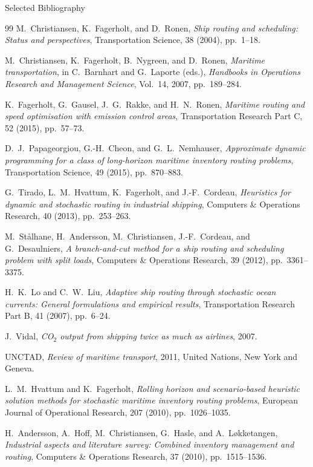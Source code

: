 \documentclass[aspectratio=169,10pt]{beamer}
\begin{document}
\begin{frame}[allowframebreaks]{Selected Bibliography}
  \begin{thebibliography}{99}
    M.\ Christiansen, K.\ Fagerholt, and D.\ Ronen,
    \emph{Ship routing and scheduling: Status and perspectives},
    Transportation Science, 38 (2004), pp.\ 1--18.

    M.\ Christiansen, K.\ Fagerholt, B.\ Nygreen, and D.\ Ronen,
    \emph{Maritime transportation},
    in C.\ Barnhart and G.\ Laporte (eds.),
    \textit{Handbooks in Operations Research and Management Science},
    Vol.\ 14, 2007, pp.\ 189--284.

    K.\ Fagerholt, G.\ Gausel, J.\ G.\ Rakke, and H.\ N.\ Ronen,
    \emph{Maritime routing and speed optimisation with emission control areas},
    Transportation Research Part C, 52 (2015), pp.\ 57--73.

    D.\ J.\ Papageorgiou, G.-H.\ Cheon, and G.\ L.\ Nemhauser,
    \emph{Approximate dynamic programming for a class of long-horizon
    maritime inventory routing problems},
    Transportation Science, 49 (2015), pp.\ 870--883.

    G.\ Tirado, L.\ M.\ Hvattum, K.\ Fagerholt, and J.-F.\ Cordeau,
    \emph{Heuristics for dynamic and stochastic routing in industrial shipping},
    Computers \& Operations Research, 40 (2013), pp.\ 253--263.

    M.\ St\aa lhane, H.\ Andersson, M.\ Christiansen, J.-F.\ Cordeau, and
    G.\ Desaulniers,
    \emph{A branch-and-cut method for a ship routing and scheduling problem
    with split loads},
    Computers \& Operations Research, 39 (2012), pp.\ 3361--3375.

    H.\ K.\ Lo and C.\ W.\ Liu,
    \emph{Adaptive ship routing through stochastic ocean currents:
    General formulations and empirical results},
    Transportation Research Part B, 41 (2007), pp.\ 6--24.

    J.\ Vidal,
    \emph{CO$_2$ output from shipping twice as much as airlines}, 2007.

    UNCTAD,
    \emph{Review of maritime transport}, 2011,
    United Nations, New York and Geneva.

    L.\ M.\ Hvattum and K.\ Fagerholt,
    \emph{Rolling horizon and scenario-based heuristic solution methods
    for stochastic maritime inventory routing problems},
    European Journal of Operational Research, 207 (2010), pp.\ 1026--1035.

    H.\ Andersson, A.\ Hoff, M.\ Christiansen, G.\ Hasle, and A.\ L\o kketangen,
    \emph{Industrial aspects and literature survey: Combined inventory
    management and routing},
    Computers \& Operations Research, 37 (2010), pp.\ 1515--1536.
  \end{thebibliography}
\end{frame}
\end{document}
